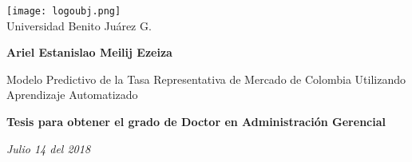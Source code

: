 \begin{titlepage}
\begin{center}
\vspace*{1cm}    

\texttt{[image: logoubj.png]} \\
\large{Universidad Benito Juárez G.}

\vspace{3cm}
\textbf{Ariel Estanislao Meilij Ezeiza}

\vspace{3cm}
\huge
Modelo Predictivo de la Tasa Representativa de Mercado de Colombia Utilizando Aprendizaje Automatizado

\vspace{3cm}
\large
\textbf{Tesis para obtener el grado de Doctor en Administración Gerencial}

\vspace{4cm}
\small
\textit{Julio 14 del 2018}

\end{center}
\end{titlepage}

